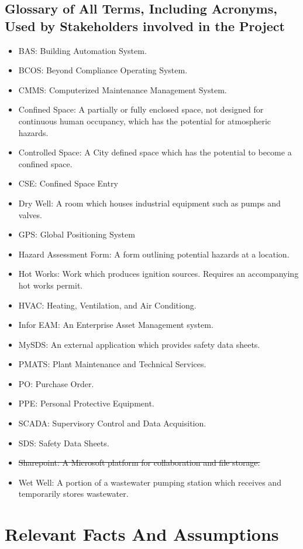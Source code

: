 \documentclass[12pt]{article}
\begin{document}
\subsection{Glossary of All Terms, Including Acronyms, Used by Stakeholders
involved in the Project}
\begin{itemize}
  \item BAS: Building Automation System.
  \item BCOS: Beyond Compliance Operating System.
  \item CMMS: Computerized Maintenance Management System.
  \item Confined Space: A partially or fully enclosed space, not designed for
    continuous human occupancy, which has the potential for atmospheric hazards.
  \item Controlled Space: A City defined space which has the potential to
    become a confined space.
  \item CSE: Confined Space Entry
  \item Dry Well: A room which houses industrial equipment such as pumps
    and valves.
  \item GPS: Global Positioning System
  \item Hazard Assessment Form: A form outlining potential
    hazards at a location.
  \item Hot Works: Work which produces ignition sources.
    Requires an accompanying hot works permit.
  \item HVAC: Heating, Ventilation, and Air Conditiong.
  \item Infor EAM: An Enterprise Asset Management system.
  \item MySDS: An external application which provides safety data sheets.
  \item PMATS: Plant Maintenance and Technical Services.
  \item PO: Purchase Order.
  \item PPE: Personal Protective Equipment.
  \item SCADA: Supervisory Control and Data Acquisition.
  \item SDS: Safety Data Sheets.
  \item \sout{Sharepoint: A Microsoft platform for collaboration and file storage.}
  \item Wet Well: A portion of a wastewater pumping station which receives
    and temporarily stores wastewater.
\end{itemize}

\section{Relevant Facts And Assumptions}
\end{document}

